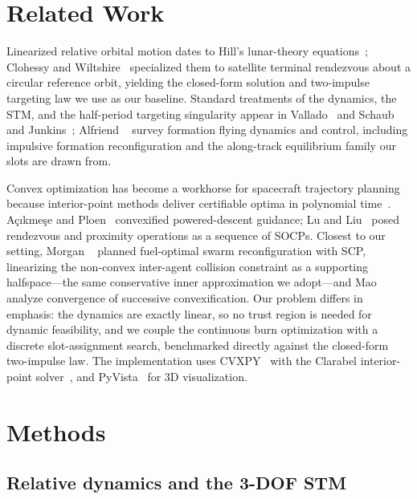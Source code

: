\documentclass[10pt,twocolumn,letterpaper]{article}
\begin{document}
\section{Related Work}
\label{sec:related}

Linearized relative orbital motion dates to Hill's lunar-theory
equations~\cite{hill1878}; Clohessy and Wiltshire~\cite{cw1960} specialized
them to satellite terminal rendezvous about a circular reference orbit,
yielding the closed-form solution and two-impulse targeting law we use as our
baseline. Standard treatments of the dynamics, the STM, and the half-period
targeting singularity appear in Vallado~\cite{vallado2013} and Schaub and
Junkins~\cite{schaub2018}; Alfriend \etal~\cite{alfriend2010} survey formation
flying dynamics and control, including impulsive formation reconfiguration and
the along-track equilibrium family our slots are drawn from.

Convex optimization has become a workhorse for spacecraft trajectory planning
because interior-point methods deliver certifiable optima in polynomial
time~\cite{boyd2004}. A\c{c}{\i}kme\c{s}e and Ploen~\cite{acikmese2007}
convexified powered-descent guidance; Lu and Liu~\cite{lu2013} posed
rendezvous and proximity operations as a sequence of SOCPs. Closest to our
setting, Morgan \etal~\cite{morgan2014} planned fuel-optimal swarm
reconfiguration with SCP, linearizing the non-convex inter-agent collision
constraint as a supporting halfspace---the same conservative inner
approximation we adopt---and Mao \etal~\cite{mao2016} analyze convergence of
successive convexification. Our problem differs in emphasis: the dynamics are
exactly linear, so no trust region is needed for dynamic feasibility, and we
couple the continuous burn optimization with a discrete slot-assignment
search, benchmarked directly against the closed-form two-impulse law. The
implementation uses CVXPY~\cite{diamond2016} with the Clarabel interior-point
solver~\cite{clarabel2024}, and PyVista~\cite{sullivan2019} for 3D
visualization.

\section{Methods}
\label{sec:methods}

\subsection{Relative dynamics and the 3-DOF STM}
\label{sec:dynamics}
\end{document}

